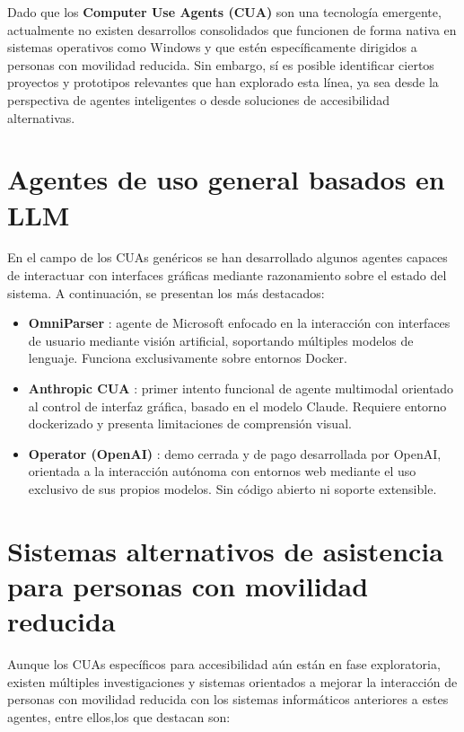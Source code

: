 
Dado que los \textbf{Computer Use Agents (CUA)} son una tecnología emergente, actualmente no existen desarrollos consolidados que funcionen de forma nativa en sistemas operativos como Windows y que estén específicamente dirigidos a personas con movilidad reducida. Sin embargo, sí es posible identificar ciertos proyectos y prototipos relevantes que han explorado esta línea, ya sea desde la perspectiva de agentes inteligentes o desde soluciones de accesibilidad alternativas.

\section{Agentes de uso general basados en LLM}

En el campo de los CUAs genéricos se han desarrollado algunos agentes capaces de interactuar con interfaces gráficas mediante razonamiento sobre el estado del sistema. A continuación, se presentan los más destacados:

\begin{itemize}
    \item \textbf{OmniParser} \cite{OmniParser}: agente de Microsoft enfocado en la interacción con interfaces de usuario mediante visión artificial, soportando múltiples modelos de lenguaje. Funciona exclusivamente sobre entornos Docker.
    
    \item \textbf{Anthropic CUA} \cite{Anthropic_CUA}: primer intento funcional de agente multimodal orientado al control de interfaz gráfica, basado en el modelo Claude. Requiere entorno dockerizado y presenta limitaciones de comprensión visual.
    
    \item \textbf{Operator (OpenAI)} \cite{Operator_OPENAI}: demo cerrada y de pago desarrollada por OpenAI, orientada a la interacción autónoma con entornos web mediante el uso exclusivo de sus propios modelos. Sin código abierto ni soporte extensible.
\end{itemize}

\section{Sistemas alternativos de asistencia para personas con movilidad reducida}

Aunque los CUAs específicos para accesibilidad aún están en fase exploratoria, existen múltiples investigaciones y sistemas orientados a mejorar la interacción de personas con movilidad reducida con los sistemas informáticos anteriores a estes agentes, entre ellos,los que destacan son:

